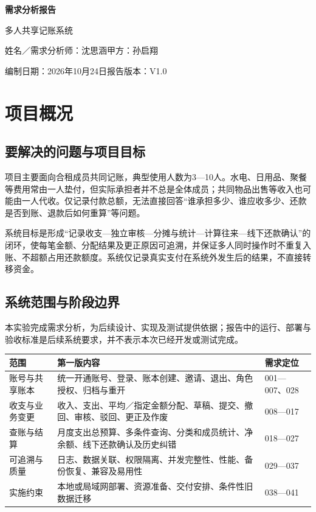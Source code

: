 \documentclass[UTF8,a4paper,11pt,fontset=fandol]{ctexart}
\renewcommand{\arraystretch}{1.3}
\newcommand{\smalltable}{\small\setlength{\tabcolsep}{5pt}\renewcommand{\arraystretch}{1.25}}
\begin{document}
\begin{center}
{\LARGE\bfseries\color{navy}需求分析报告}\par
\vspace{4pt}
{\Large 多人共享记账系统}\par
\vspace{7pt}
{\normalsize 姓名／需求分析师：沈思涵\quad 甲方：孙启翔}\par
{\small 编制日期：2026年10月24日\quad 报告版本：V1.0}
\end{center}
\vspace{-6pt}
\section{项目概况}
\subsection{要解决的问题与项目目标}
项目主要面向合租成员共同记账，典型使用人数为3—10人。水电、日用品、聚餐等费用常由一人垫付，但实际承担者并不总是全体成员；共同物品出售等收入也可能由一人代收。仅记录付款总额，无法直接回答“谁承担多少、谁应收多少、还款是否到账、退款后如何重算”等问题。

系统目标是形成“记录收支—独立审核—分摊与统计—计算往来—线下还款确认”的闭环，使每笔金额、分配结果及更正原因可追溯，并保证多人同时操作时不重复入账、不超额占用还款额度。系统仅记录真实支付在系统外发生后的结果，不直接转移资金。

\subsection{系统范围与阶段边界}
本实验完成需求分析，为后续设计、实现及测试提供依据；报告中的运行、部署与验收标准是后续系统要求，并不表示本次已经开发或测试完成。

\begin{center}\smalltable
\begin{tabularx}{\linewidth}{p{25mm}Yp{27mm}}
\toprule
{}范围 & 第一版内容 & 需求定位\\
\midrule
账号与共享账本 & 统一开通账号、登录、账本创建、邀请、退出、角色授权、归档与重开 & 001—007、028\\
收支与业务变更 & 收入、支出、平均／指定金额分配、草稿、提交、撤回、审核、驳回、更正及作废 & 008—017\\
查账与结算 & 月度支出总预算、多条件查询、分类和成员统计、净余额、线下还款确认及历史纠错 & 018—027\\
可追溯与质量 & 日志、数据关联、权限隔离、并发完整性、性能、备份恢复、兼容及易用性 & 029—037\\
实施约束 & 本地或局域网部署、资源准备、交付安排、条件性旧数据迁移 & 038—041\\
\bottomrule
\end{tabularx}
\end{center}
\end{document}

